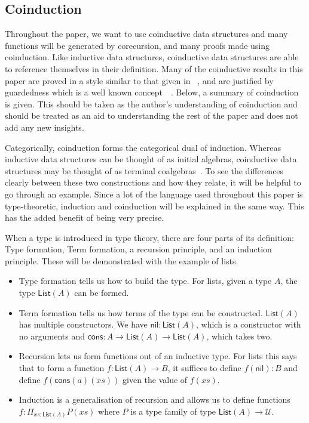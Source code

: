 \documentclass{article}
\theoremstyle{definition}
\theoremstyle{remark}
\begin{document}
\subsection{Coinduction}\label{sec:coinduction}

Throughout the paper, we want to use coinductive data structures and many functions will be generated by corecursion, and many proofs made using coinduction. Like inductive data structures, coinductive data structures are able to reference themselves in their definition. Many of the coinductive results in this paper are proved in a style similar to that given in ~\cite{kozen_silva_2017}, and are justified by guardedness which is a well known concept~\cite{10.1007/3-540-58085-9_72}~\cite{gimenez1995codifying}. Below, a summary of coinduction is given. This should be taken as the author's understanding of coinduction and should be treated as an aid to understanding the rest of the paper and does not add any new insights.

Categorically, coinduction forms the categorical dual of induction. Whereas inductive data structures can be thought of as initial algebras, coinductive data structures may be thought of as terminal coalgebras~\cite{jacobs1997tutorial}. To see the differences clearly between these two constructions and how they relate, it will be helpful to go through an example. Since a lot of the language used throughout this paper is type-theoretic, induction and coinduction will be explained in the same way. This has the added benefit of being very precise.

When a type is introduced in type theory, there are four parts of its definition: Type formation, Term formation, a recursion principle, and an induction principle. These will be demonstrated with the example of lists.
\begin{itemize}
\item Type formation tells us how to build the type. For lists, given a type \(A\), the type \(\mathsf{List}(A)\) can be formed.
\item Term formation tells us how terms of the type can be constructed. \(\mathsf{List}(A)\) has multiple constructors. We have \(\mathsf{nil} : \mathsf{List}(A)\), which is a constructor with no arguments and \(\mathsf{cons} : A \to \mathsf{List}(A) \to \mathsf{List}(A)\), which takes two.
\item Recursion lets us form functions out of an inductive type. For lists this says that to form a function \(f : \mathsf{List}(A) \to B\), it suffices to define \(f(\mathsf{nil}) : B\) and define \(f(\mathsf{cons}(a)(xs))\) given the value of \(f(xs)\).
\item Induction is a generalisation of recursion and allows us to define functions \(f : \Pi_{xs : \mathsf{List}(A)} P(xs)\) where \(P\) is a type family of type \(\mathsf{List}(A) \to \mathcal{U}\).
\end{itemize}
\end{document}
